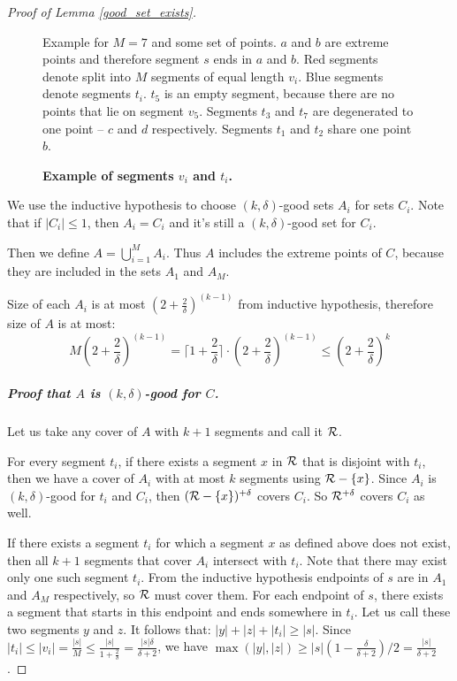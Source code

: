 \begin{proof}[Proof of Lemma \ref{good_set_exists}]
\begin{figure}[h]
\centering
\def\svgwidth{\columnwidth}

\caption{\textbf{Example of segments $v_i$ and $t_i$.}}
Example for $M = 7$ and some set of points.
$a$ and $b$ are extreme points and therefore segment $s$
ends in $a$ and $b$.
Red segments denote split into $M$ segments of equal length $v_i$.
Blue segments denote segments $t_i$. $t_5$ is an empty segment,
because there are no points that lie on segment $v_5$.
Segments $t_3$ and $t_7$ are degenerated to one point --
$c$ and $d$ respectively.
Segments $t_1$ and $t_2$ share one point $b$.
\label{fig:fpt_v_f_def}
\end{figure}

We use the inductive hypothesis to choose $(k, \delta)$-good sets $A_i$
for sets $C_i$. Note that if $|C_i| \le 1$, then $A_i = C_i$
and it's still a $(k, \delta)$-good set for $C_i$.

Then we define $A = \bigcup_{i=1}^{M} A_i$.
Thus $A$ includes the extreme points of $C$,
because they are included in the sets $A_1$ and $A_M$.

Size of each $A_i$ is at most $(2+\frac{2}{\delta})^(k-1)$ from inductive
hypothesis, therefore size of $A$ is at most:
$$M(2+\frac{2}{\delta})^{(k-1)} =
\lceil1+\frac{2}{\delta}\rceil\cdot(2+\frac{2}{\delta})^{(k-1)}
\le (2+\frac{2}{\delta})^k$$


\subparagraph{Proof that $A$ is $(k, \delta)$-good for $C$.}
Let us take any cover of $A$ with $k+1$ segments and call it $\mathcal{R}$.

For every segment $t_i$, if there exists a segment $x$ in $\mathcal{R}$ 
that is disjoint with $t_i$,
then we have a cover of $A_i$ with at most $k$
segments using $\mathcal{R} - \{x\}$.
Since $A_i$ is $(k, \delta)$-good for $t_i$ and $C_i$,
then $(\mathcal{R} - \{x\})^{+\delta}$ covers $C_i$.
So $\mathcal{R}^{+\delta}$ covers $C_i$ as well.

If there exists a segment $t_i$ for which a segment $x$ as defined above
does not exist, then all $k+1$ segments that cover
$A_i$ intersect with $t_i$.
Note that there may exist only one such segment $t_i$.
From the inductive hypothesis endpoints of $s$ are
in $A_1$ and $A_M$ respectively, so $\mathcal{R}$ must cover them.
For each endpoint of $s$, there exists
a segment that starts in this endpoint and ends somewhere in $t_i$.
Let us call these two segments $y$ and $z$. It follows that:
$|y| + |z| + |t_i| \ge |s|$.
Since $|t_i| \le |v_i| = \frac{|s|}{M} \le \frac{|s|}{1+\frac{2}{\delta}} = \frac{|s|\delta}{\delta+2}$,
we have $\max(|y|, |z|) \ge |s|(1-\frac{\delta}{\delta+2})/2 = \frac{|s|}{\delta+2}$.


\end{proof}
